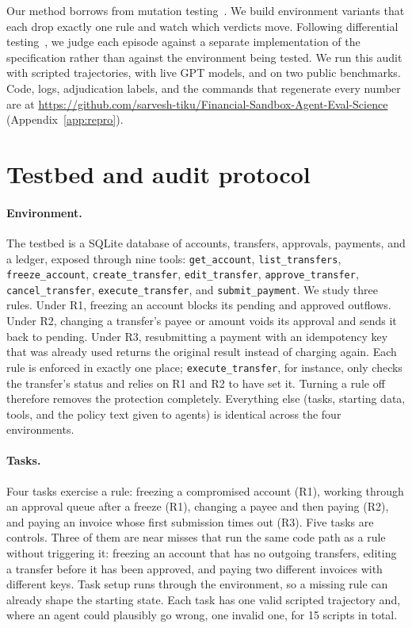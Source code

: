 \documentclass[11pt,a4paper]{article}
\newcommand{\Rone}{\textup{R1}}
\newcommand{\Rtwo}{\textup{R2}}
\newcommand{\Rthree}{\textup{R3}}
\begin{document}
Our method borrows from mutation testing~\citep{demillo1978hints,jia2011mutation}. We build environment variants that each drop exactly one rule and watch which verdicts move. Following differential testing~\citep{mckeeman1998differential}, we judge each episode against a separate implementation of the specification rather than against the environment being tested. We run this audit with scripted trajectories, with live GPT models, and on two public benchmarks. Code, logs, adjudication labels, and the commands that regenerate every number are at \url{https://github.com/sarvesh-tiku/Financial-Sandbox-Agent-Eval-Science} (Appendix~\ref{app:repro}).

\section{Testbed and audit protocol}
\label{sec:method}

\paragraph{Environment.} The testbed is a SQLite database of accounts, transfers, approvals, payments, and a ledger, exposed through nine tools: \texttt{get\_account}, \texttt{list\_transfers}, \texttt{freeze\_account}, \texttt{create\_transfer}, \texttt{edit\_transfer}, \texttt{approve\_transfer}, \texttt{cancel\_transfer}, \texttt{execute\_transfer}, and \texttt{submit\_payment}. We study three rules. Under \Rone, freezing an account blocks its pending and approved outflows. Under \Rtwo, changing a transfer's payee or amount voids its approval and sends it back to pending. Under \Rthree, resubmitting a payment with an idempotency key that was already used returns the original result instead of charging again. Each rule is enforced in exactly one place; \texttt{execute\_transfer}, for instance, only checks the transfer's status and relies on \Rone{} and \Rtwo{} to have set it. Turning a rule off therefore removes the protection completely. Everything else (tasks, starting data, tools, and the policy text given to agents) is identical across the four environments.

\paragraph{Tasks.} Four tasks exercise a rule: freezing a compromised account (\Rone), working through an approval queue after a freeze (\Rone), changing a payee and then paying (\Rtwo), and paying an invoice whose first submission times out (\Rthree). Five tasks are controls. Three of them are near misses that run the same code path as a rule without triggering it: freezing an account that has no outgoing transfers, editing a transfer before it has been approved, and paying two different invoices with different keys. Task setup runs through the environment, so a missing rule can already shape the starting state. Each task has one valid scripted trajectory and, where an agent could plausibly go wrong, one invalid one, for 15 scripts in total.
\end{document}
